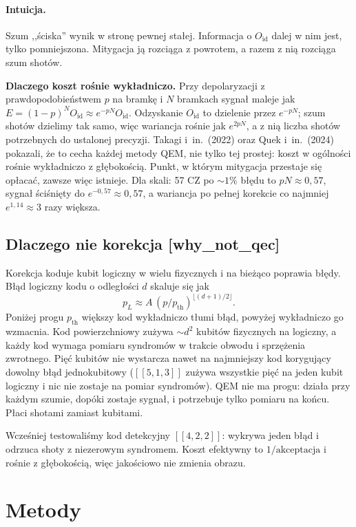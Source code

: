 \documentclass[11pt,a4paper]{article}
\newcommand{\slid}[1]{\hfill{\normalfont\small\ttfamily\color{axbluedk}[#1]}}
\newcommand{\Oid}{O_{\mathrm{id}}}
\newcommand{\intu}{\paragraph{Intuicja.}}
\begin{document}
\intu Szum ,,ściska'' wynik w stronę pewnej stałej. Informacja o $\Oid$ dalej w nim jest, tylko
pomniejszona. Mitygacja ją rozciąga z powrotem, a razem z nią rozciąga szum shotów.

\textbf{Dlaczego koszt rośnie wykładniczo.} Przy depolaryzacji z prawdopodobieństwem $p$ na
bramkę i $N$ bramkach sygnał maleje jak $E=(1-p)^N\Oid\approx e^{-pN}\Oid$. Odzyskanie $\Oid$ to
dzielenie przez $e^{-pN}$; szum shotów dzielimy tak samo, więc wariancja rośnie jak $e^{2pN}$, a
z nią liczba shotów potrzebnych do ustalonej precyzji. Takagi i~in.\ (2022) oraz Quek i~in.\
(2024) pokazali, że to cecha każdej metody QEM, nie tylko tej prostej: koszt w ogólności rośnie
wykładniczo z głębokością. Punkt, w którym mitygacja przestaje się opłacać, zawsze więc
istnieje. Dla skali: 57 CZ po $\sim1\%$ błędu to $pN\approx0{,}57$, sygnał ściśnięty do
$e^{-0{,}57}\approx0{,}57$, a wariancja po pełnej korekcie co najmniej $e^{1{,}14}\approx3$ razy
większa.

\subsection{Dlaczego nie korekcja \slid{why\_not\_qec}}

Korekcja koduje kubit logiczny w wielu fizycznych i na bieżąco poprawia błędy. Błąd logiczny
kodu o odległości $d$ skaluje się jak
\[
  p_L\approx A\,(p/p_{\text{th}})^{\lfloor(d+1)/2\rfloor}.
\]
Poniżej progu $p_{\text{th}}$ większy kod wykładniczo tłumi błąd, powyżej wykładniczo go
wzmacnia. Kod powierzchniowy zużywa $\sim d^2$ kubitów fizycznych na logiczny, a każdy kod
wymaga pomiaru syndromów w trakcie obwodu i sprzężenia zwrotnego. Pięć kubitów nie wystarcza
nawet na najmniejszy kod korygujący dowolny błąd jednokubitowy ($[[5,1,3]]$ zużywa wszystkie
pięć na jeden kubit logiczny i nic nie zostaje na pomiar syndromów). QEM nie ma progu: działa przy
każdym szumie, dopóki zostaje sygnał, i potrzebuje tylko pomiaru na końcu. Płaci shotami zamiast
kubitami.

Wcześniej testowaliśmy kod detekcyjny $[[4,2,2]]$: wykrywa jeden błąd i odrzuca shoty z
niezerowym syndromem. Koszt efektywny to $1/\text{akceptacja}$ i rośnie z głębokością, więc
jakościowo nie zmienia obrazu.

\section{Metody}
\end{document}
